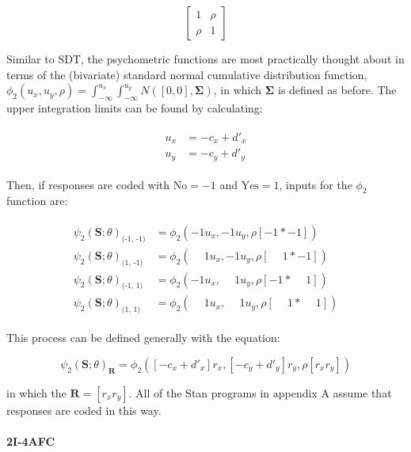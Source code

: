 \documentclass{article}\usepackage{knitr}
\begin{document}
$$
\begin{bmatrix}
1 & \rho \\
\rho & 1
\end{bmatrix}
$$

Similar to SDT, the psychometric functions are most practically thought about in terms of the (bivariate) standard normal cumulative distribution function, $\phi_2(u_x, u_y, \rho) = \int_{-\infty}^{u_x} \int_{-\infty}^{u_y} N([0,0], \bm{\Sigma})$, in which $\bm{\Sigma}$ is defined as before. The upper integration limits can be found by calculating:

\begin{align*}
\begin{split}
u_x &= -c_x + d'_x \\
u_y &= -c_y + d'_y
\end{split}
\end{align*}

Then, if responses are coded with $\text{No} = -1$ and $ \text{Yes} = 1$, inputs for the $\phi_2$ function are:

\begin{align*}
\begin{split}
\psi_2(\bm{S}; \theta)_{\text{(-1, -1)}} &= \phi_2(-1 u_x, -1 u_y, \rho [-1 * -1]) \\
\psi_2(\bm{S}; \theta)_{\text{(1, -1)}}  &= \phi_2(\phantom{-}1 u_x, -1 u_y, \rho [\phantom{-}1 * -1]) \\
\psi_2(\bm{S}; \theta)_{\text{(-1, 1)}}  &= \phi_2(-1 u_x, \phantom{-}1 u_y, \rho [-1 * \phantom{-}1]) \\
\psi_2(\bm{S}; \theta)_{\text{(1, 1)}}   &= \phi_2(\phantom{-}1 u_x, \phantom{-}1 u_y, \rho [\phantom{-}1 * \phantom{-}1]) 
\end{split}
\end{align*}

This process can be defined generally with the equation:

\begin{equation}
\psi_2(\bm{S}; \theta)_{\bm{R}} = \phi_2([-c_x + d'_x]r_x, [-c_y + d'_y] r_y, \rho [r_x r_y])
\label{eq:generalPfun}
\end{equation}

in which the $\bm{R} = [r_x r_y]$. All of the Stan \citep{stan2019} programs in appendix A assume that responses are coded in this way.

\paragraph{2I-4AFC}
\end{document}
